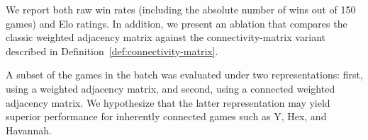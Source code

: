 \documentclass[11pt,a4paper]{article}
\theoremstyle{plain}
\theoremstyle{definition}
\begin{document}
\vspace{0.5em}

We report both raw win rates (including the absolute number of wins out of 150 games) and Elo ratings. In addition, we present an ablation that compares the classic weighted adjacency matrix against the connectivity-matrix variant described in Definition~\ref{def:connectivity-matrix}.

\vspace{0.5em}

A subset of the games in the batch was evaluated under two representations: first, using a weighted adjacency matrix, and second, using a connected weighted adjacency matrix. We hypothesize that the latter representation may yield superior performance for inherently connected games such as Y, Hex, and Havannah.

\vspace{0.5em}
\end{document}

